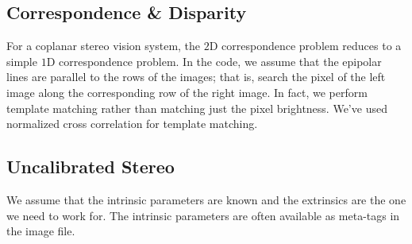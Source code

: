 \documentclass{report}
\begin{document}
\subsection{Correspondence \& Disparity}
\hspace{\parindent}For a coplanar stereo vision system, the $2$D correspondence problem reduces to a simple $1$D correspondence problem. In the code, we assume that the epipolar lines are parallel to the rows of the images; that is, search the pixel of the left image along the corresponding row of the right image. In fact, we perform template matching rather than matching just the pixel brightness. We've used normalized cross correlation for template matching.


\subsection{Uncalibrated Stereo}
\hspace{\parindent}We assume that the intrinsic parameters are known and the extrinsics are the one we need to work for. The intrinsic parameters are often available as meta-tags in the image file.

\end{document}
